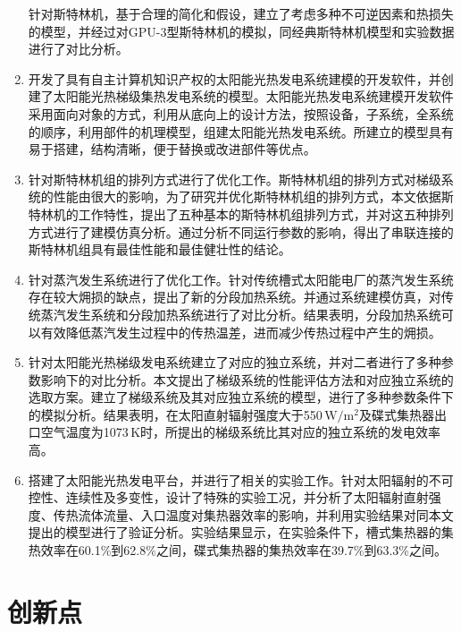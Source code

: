 \begin{enumerate}[label=(\arabic*)]
  针对斯特林机，基于合理的简化和假设，建立了考虑多种不可逆因素和热损失的模型，并经过对GPU-3型斯特林机的模拟，同经典斯特林机模型和实验数据进行了对比分析。
  \item 开发了具有自主计算机知识产权的太阳能光热发电系统建模的开发软件，并创建了太阳能光热梯级集热发电系统的模型。太阳能光热发电系统建模开发软件采用面向对象的方式，利用从底向上的设计方法，按照设备，子系统，全系统的顺序，利用部件的机理模型，组建太阳能光热发电系统。所建立的模型具有易于搭建，结构清晰，便于替换或改进部件等优点。
  \item 针对斯特林机组的排列方式进行了优化工作。斯特林机组的排列方式对梯级系统的性能由很大的影响，为了研究并优化斯特林机组的排列方式，本文依据斯特林机的工作特性，提出了五种基本的斯特林机组排列方式，并对这五种排列方式进行了建模仿真分析。通过分析不同运行参数的影响，得出了串联连接的斯特林机组具有最佳性能和最佳健壮性的结论。
  \item 针对蒸汽发生系统进行了优化工作。针对传统槽式太阳能电厂的蒸汽发生系统存在较大㶲损的缺点，提出了新的分段加热系统。并通过系统建模仿真，对传统蒸汽发生系统和分段加热系统进行了对比分析。结果表明，分段加热系统可以有效降低蒸汽发生过程中的传热温差，进而减少传热过程中产生的㶲损。
  \item 针对太阳能光热梯级发电系统建立了对应的独立系统，并对二者进行了多种参数影响下的对比分析。本文提出了梯级系统的性能评估方法和对应独立系统的选取方案。建立了梯级系统及其对应独立系统的模型，进行了多种参数条件下的模拟分析。结果表明，在太阳直射辐射强度大于550\,$\mathrm{W/m^2}$及碟式集热器出口空气温度为1073$\,\mathrm{K}$时，所提出的梯级系统比其对应的独立系统的发电效率高。
	\item 搭建了太阳能光热发电平台，并进行了相关的实验工作。针对太阳辐射的不可控性、连续性及多变性，设计了特殊的实验工况，并分析了太阳辐射直射强度、传热流体流量、入口温度对集热器效率的影响，并利用实验结果对同本文提出的模型进行了验证分析。实验结果显示，在实验条件下，槽式集热器的集热效率在60.1\%到62.8\%之间，碟式集热器的集热效率在39.7\%到63.3\%之间。
\end{enumerate}

\section{创新点}

